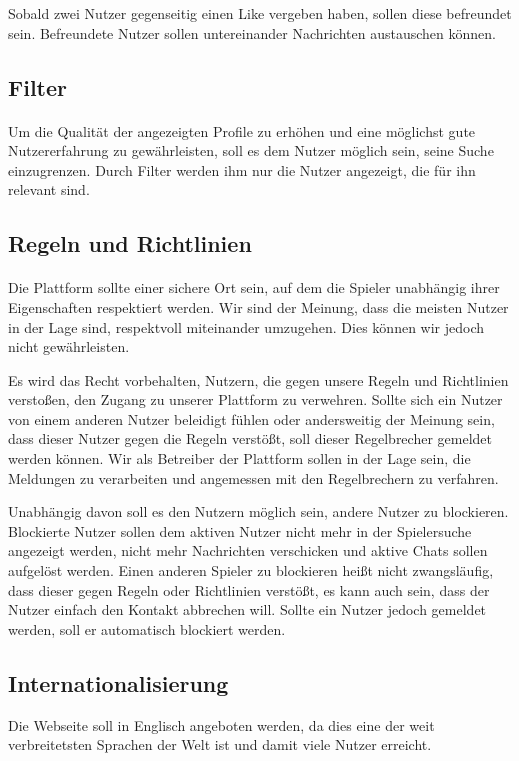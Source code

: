Sobald zwei Nutzer gegenseitig einen Like vergeben haben, sollen diese befreundet sein. Befreundete Nutzer sollen untereinander Nachrichten austauschen können.

\subsection{Filter}
\paragraph{}
Um die Qualität der angezeigten Profile zu erhöhen und eine möglichst gute Nutzererfahrung zu gewährleisten, soll es dem Nutzer möglich sein, seine Suche einzugrenzen. Durch Filter werden ihm nur die Nutzer angezeigt, die für ihn relevant sind.

\subsection{Regeln und Richtlinien}
\paragraph{}
Die Plattform sollte einer sichere Ort sein, auf dem die Spieler unabhängig ihrer Eigenschaften respektiert werden. Wir sind der Meinung, dass die meisten Nutzer in der Lage sind, respektvoll miteinander umzugehen.
Dies können wir jedoch nicht gewährleisten.

Es wird das Recht vorbehalten, Nutzern, die gegen unsere Regeln und Richtlinien verstoßen, den Zugang zu unserer Plattform zu verwehren. Sollte sich ein Nutzer von einem anderen Nutzer beleidigt fühlen oder andersweitig der Meinung sein, dass dieser Nutzer gegen die Regeln verstößt, soll dieser Regelbrecher gemeldet werden können. Wir als Betreiber der Plattform sollen in der Lage sein, die Meldungen zu verarbeiten und angemessen mit den Regelbrechern zu verfahren.

Unabhängig davon soll es den Nutzern möglich sein, andere Nutzer zu blockieren. Blockierte Nutzer sollen dem aktiven Nutzer nicht mehr in der Spielersuche angezeigt werden, nicht mehr Nachrichten verschicken und aktive Chats sollen aufgelöst werden. Einen anderen Spieler zu blockieren heißt nicht zwangsläufig, dass dieser gegen Regeln oder Richtlinien verstößt, es kann auch sein, dass der Nutzer einfach den Kontakt abbrechen will. Sollte ein Nutzer jedoch gemeldet werden, soll er automatisch blockiert werden.

\subsection{Internationalisierung}
Die Webseite soll in Englisch angeboten werden, da dies eine der weit verbreitetsten Sprachen der Welt ist und damit viele Nutzer erreicht.

